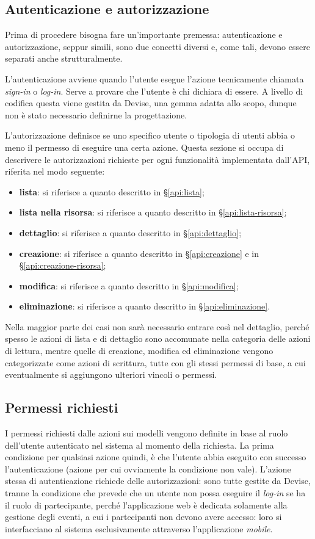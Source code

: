 \subsection{Autenticazione e autorizzazione}
Prima di procedere bisogna fare un'importante premessa: autenticazione e autorizzazione, seppur simili, sono due concetti diversi e, come tali, devono essere separati anche strutturalmente.

L'autenticazione avviene quando l'utente esegue l'azione tecnicamente chiamata \emph{sign-in} o \emph{log-in}. Serve a provare che l'utente è chi dichiara di essere. A livello di codifica questa viene gestita da Devise, una gemma adatta allo scopo, dunque non è stato necessario definirne la progettazione.

L'autorizzazione definisce se uno specifico utente o tipologia di utenti abbia o meno il permesso di eseguire una certa azione. Questa sezione si occupa di descrivere le autorizzazioni richieste per ogni funzionalità implementata dall'API, riferita nel modo seguente:
\begin{itemize}
	\item \textbf{lista}: si riferisce a quanto descritto in \S \ref{api:lista};
	\item \textbf{lista nella risorsa}: si riferisce a quanto descritto in \S \ref{api:lista-risorsa};
	\item \textbf{dettaglio}: si riferisce a quanto descritto in \S \ref{api:dettaglio};
	\item \textbf{creazione}: si riferisce a quanto descritto in \S \ref{api:creazione} e in \S \ref{api:creazione-risorsa};
	\item \textbf{modifica}: si riferisce a quanto descritto in \S \ref{api:modifica};
	\item \textbf{eliminazione}: si riferisce a quanto descritto in \S \ref{api:eliminazione}.
\end{itemize}
Nella maggior parte dei casi non sarà necessario entrare così nel dettaglio, perché spesso le azioni di lista e di dettaglio sono accomunate nella categoria delle azioni di lettura, mentre quelle di creazione, modifica ed eliminazione vengono categorizzate come azioni di scrittura, tutte con gli stessi permessi di base, a cui eventualmente si aggiungono ulteriori vincoli o permessi.

\subsection{Permessi richiesti}
I permessi richiesti dalle azioni sui modelli vengono definite in base al ruolo dell'utente autenticato nel sistema al momento della richiesta. La prima condizione per qualsiasi azione quindi, è che l'utente abbia eseguito con successo l'autenticazione (azione per cui ovviamente la condizione non vale). L'azione stessa di autenticazione richiede delle autorizzazioni: sono tutte gestite da Devise, tranne la condizione che prevede che un utente non possa eseguire il \emph{log-in} se ha il ruolo di partecipante, perché l'applicazione web è dedicata solamente alla gestione degli eventi, a cui i partecipanti non devono avere accesso: loro si interfacciano al sistema esclusivamente attraverso l'applicazione \emph{mobile}.


